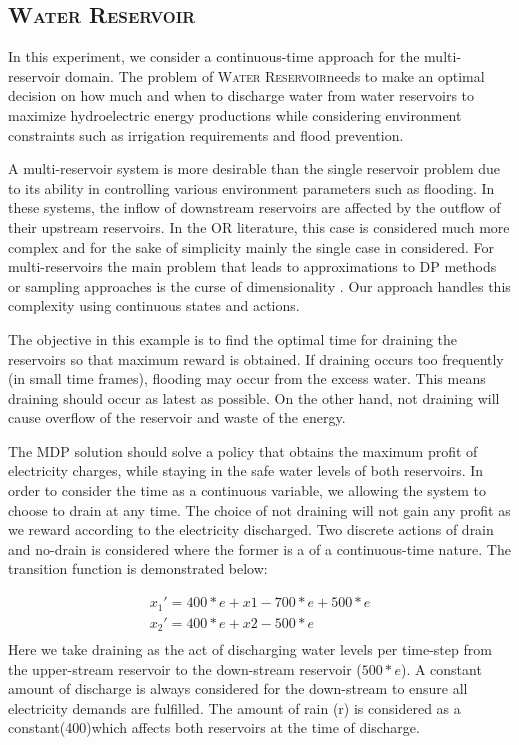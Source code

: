 \documentclass[letterpaper]{article}
\newcommand{\WaterReservoir}{\textsc{Water Reservoir}}
\begin{document}
\subsection{\WaterReservoir}

In this experiment, we consider a continuous-time approach for the multi-reservoir domain.  
The problem of \WaterReservoir  needs to make an optimal decision on how much and when to discharge water from water reservoirs to maximize hydroelectric energy productions while considering environment constraints such as irrigation requirements and flood prevention. 

A multi-reservoir system is more desirable than the single reservoir problem due to its ability in controlling various environment parameters such as flooding.  In these systems, the inflow of downstream reservoirs are affected by the outflow of their upstream reservoirs. In the OR literature, this case  is considered much more complex and for the sake of simplicity mainly the single case in considered. For multi-reservoirs the main problem that leads to approximations to DP methods or sampling approaches is the curse of dimensionality \cite{Mahootchi2009}. Our approach handles this complexity using continuous states and actions.

The objective in this example is to find the optimal time for draining the reservoirs so that maximum reward is obtained. If draining occurs too frequently (in small time frames), flooding may occur from the excess water. This means draining should occur as latest as possible. On the other hand, not draining will cause overflow of the reservoir and waste of the energy. 

The MDP solution should solve a policy that obtains the maximum profit of electricity charges, while staying in the safe water levels of both reservoirs. In order to consider the time as a continuous variable, we allowing the system to choose to drain at any time. The choice of not draining will not gain any profit as we reward according to the electricity discharged. Two discrete actions of drain and no-drain is considered where the former is a of a continuous-time  nature. The transition function is demonstrated below: 

{\footnotesize
\begin{align*}
x_1'  = 400 * e + x1 -700 * e + 500 * e \\
x_2'  = 400 * e + x2 - 500 * e \\
\end{align*}
}
Here we take draining as the act of discharging water levels per time-step from the upper-stream reservoir to the down-stream reservoir ($500 * e$). A constant amount of discharge is always considered for the down-stream to ensure all electricity demands are fulfilled.  The amount of rain (r) is considered as a constant(400)which affects both reservoirs at the time of discharge. 
\end{document}
